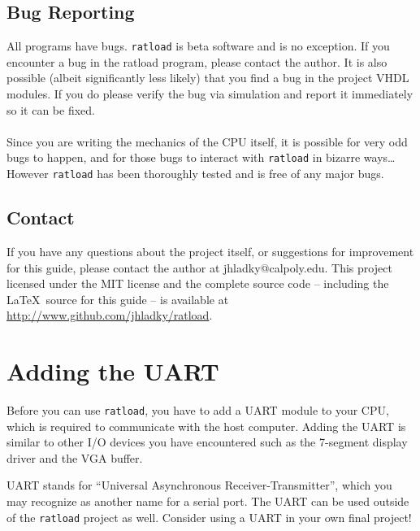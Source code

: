 \documentclass[notitlepage]{article}
\newcommand{\infosign}{\fontencoding{U}\fontfamily{futs}\huge\selectfont\char 116\relax}
\begin{document}
\subsection{Bug Reporting}
All programs have bugs. \texttt{ratload} is beta software and is no exception. If you encounter a bug in the ratload program, please contact the author. It is also possible (albeit significantly less likely) that you find a bug in the project VHDL modules. If you do please verify the bug via simulation and report it immediately so it can be fixed.\\\\
Since you are writing the mechanics of the CPU itself, it is possible for very odd bugs to happen, and for those bugs to interact with \texttt{ratload} in bizarre ways\ldots However \texttt{ratload} has been thoroughly tested and is free of any major bugs.

\subsection{Contact}
If you have any questions about the project itself, or suggestions for improvement for this guide, please contact the author at jhladky@calpoly.edu. This project licensed under the MIT license and the complete source code -- including the \LaTeX ~source for this guide -- is available at \url{http://www.github.com/jhladky/ratload}.


\section{Adding the UART}
Before you can use \texttt{ratload}, you have to add a UART module to your CPU, which is required to communicate with the host computer. Adding the UART is similar to other I/O devices you have encountered such as the 7-segment display driver and the VGA buffer.

\begin{infobox}
  {\infosign} UART stands for ``Universal Asynchronous Receiver-Transmitter'', which you may recognize as another name for a serial port. The UART can be used outside of the \texttt{ratload} project as well. Consider using a UART in your own final project!
\end{infobox}
\end{document}
